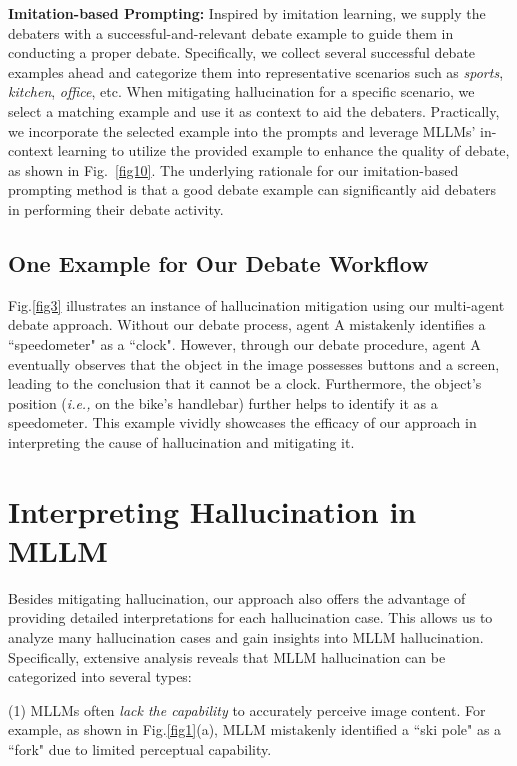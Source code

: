 \documentclass[10pt,twocolumn,letterpaper]{article}
\begin{document}
\noindent\textbf{Imitation-based Prompting:} Inspired by imitation learning, we supply the debaters with a successful-and-relevant debate example to guide them in conducting a proper debate. Specifically, we collect several successful debate examples ahead and categorize them into representative scenarios such as \emph{sports}, \emph{kitchen}, \emph{office}, etc. When mitigating hallucination for a specific scenario, we select a matching example and use it as context to aid the debaters. Practically, we incorporate the selected example into the prompts and leverage MLLMs' in-context learning to utilize the provided example to enhance the quality of debate, as shown in Fig.~\ref{fig10}.
The underlying rationale for our imitation-based prompting method is that a good debate example can significantly aid debaters in performing their debate activity. 


\subsection{One Example for Our Debate Workflow}

Fig.\ref{fig3} illustrates an instance of hallucination mitigation using our multi-agent debate approach. Without our debate process, agent A mistakenly identifies a ``speedometer" as a ``clock". However, through our debate procedure, agent A eventually observes that the object in the image possesses buttons and a screen, leading to the conclusion that it cannot be a clock. Furthermore, the object's position (\emph{i.e.,} on the bike's handlebar) further helps to identify it as a speedometer. This example vividly showcases the efficacy of our approach in interpreting the cause of hallucination and mitigating it.

\section{Interpreting Hallucination in MLLM}
Besides mitigating hallucination, our approach also offers the advantage of providing detailed interpretations for each hallucination case. This allows us to analyze many hallucination cases and gain insights into MLLM hallucination. Specifically, extensive analysis reveals that MLLM hallucination can be categorized into several types: 

(1) MLLMs often \emph{lack the capability} to accurately perceive image content. For example, as shown in Fig.\ref{fig1}(a), MLLM mistakenly identified a ``ski pole" as a ``fork" due to limited perceptual capability. 
\end{document}
